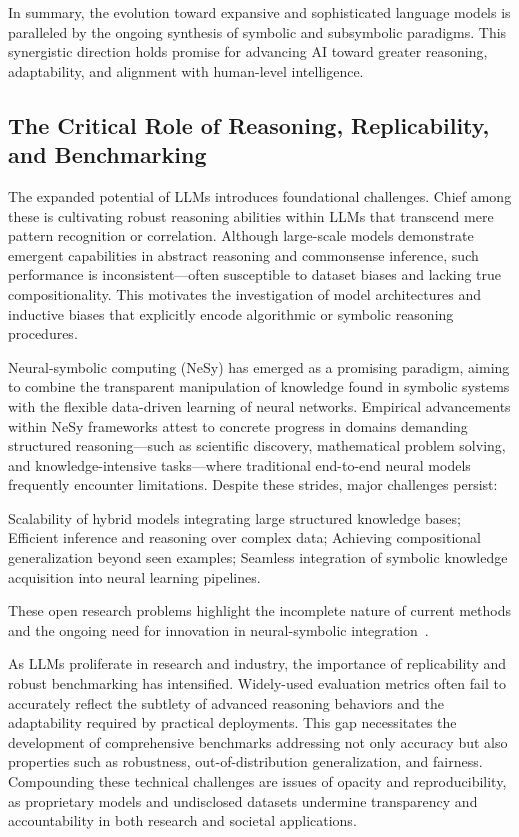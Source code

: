 \documentclass[sigconf]{acmart}
\begin{document}
In summary, the evolution toward expansive and sophisticated language models is paralleled by the ongoing synthesis of symbolic and subsymbolic paradigms. This synergistic direction holds promise for advancing AI toward greater reasoning, adaptability, and alignment with human-level intelligence.

\subsection{The Critical Role of Reasoning, Replicability, and Benchmarking}

The expanded potential of LLMs introduces foundational challenges. Chief among these is cultivating robust reasoning abilities within LLMs that transcend mere pattern recognition or correlation. Although large-scale models demonstrate emergent capabilities in abstract reasoning and commonsense inference, such performance is inconsistent—often susceptible to dataset biases and lacking true compositionality. This motivates the investigation of model architectures and inductive biases that explicitly encode algorithmic or symbolic reasoning procedures.

Neural-symbolic computing (NeSy) has emerged as a promising paradigm, aiming to combine the transparent manipulation of knowledge found in symbolic systems with the flexible data-driven learning of neural networks. Empirical advancements within NeSy frameworks attest to concrete progress in domains demanding structured reasoning—such as scientific discovery, mathematical problem solving, and knowledge-intensive tasks—where traditional end-to-end neural models frequently encounter limitations. Despite these strides, major challenges persist:

Scalability of hybrid models integrating large structured knowledge bases;
Efficient inference and reasoning over complex data;
Achieving compositional generalization beyond seen examples;
Seamless integration of symbolic knowledge acquisition into neural learning pipelines.

These open research problems highlight the incomplete nature of current methods and the ongoing need for innovation in neural-symbolic integration~\cite{ref49,ref54}.

As LLMs proliferate in research and industry, the importance of replicability and robust benchmarking has intensified. Widely-used evaluation metrics often fail to accurately reflect the subtlety of advanced reasoning behaviors and the adaptability required by practical deployments. This gap necessitates the development of comprehensive benchmarks addressing not only accuracy but also properties such as robustness, out-of-distribution generalization, and fairness. Compounding these technical challenges are issues of opacity and reproducibility, as proprietary models and undisclosed datasets undermine transparency and accountability in both research and societal applications.
\end{document}
